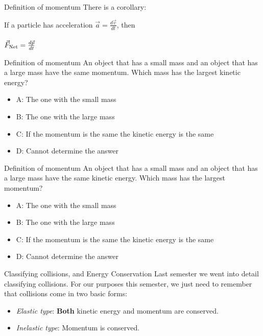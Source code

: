 \documentclass{beamer}
\begin{document}
\begin{frame}{Definition of momentum}
There is a corollary: \\ \vspace{1cm}
\begin{tcolorbox}[colback=white,colframe=red!40!blue,title=Newton's Second Law with momentum]
\alert{If a particle has acceleration $\vec{a} = \frac{d\vec{v}}{dt}$, then} \\ \\
\alert{$\vec{F}_{\rm Net} = \frac{d\vec{p}}{dt}$}
\end{tcolorbox}
\end{frame}

\begin{frame}{Definition of momentum}
An object that has a small mass and an object that has a large mass have the same momentum. Which mass has the largest kinetic energy?
\begin{itemize}
\item A: The one with the small mass
\item B: The one with the large mass
\item C: If the momentum is the same the kinetic energy is the same
\item D: Cannot determine the answer
\end{itemize}
\end{frame}

\begin{frame}{Definition of momentum}
An object that has a small mass and an object that has a large mass have the same kinetic energy. Which mass has the largest momentum?
\begin{itemize}
\item A: The one with the small mass
\item B: The one with the large mass
\item C: If the momentum is the same the kinetic energy is the same
\item D: Cannot determine the answer
\end{itemize}
\end{frame}

\begin{frame}{Classifying collisions, and Energy Conservation}
Last semester we went into detail \alert{classifying collisions}.  For our purposes this semester, we just need to remember that collisions come in two basic forms:
\begin{itemize}
\item \textit{Elastic type}: \textbf{Both} kinetic energy and momentum are conserved.
\item \textit{Inelastic type}: Momentum is conserved.
\end{itemize}
\end{frame}
\end{document}
